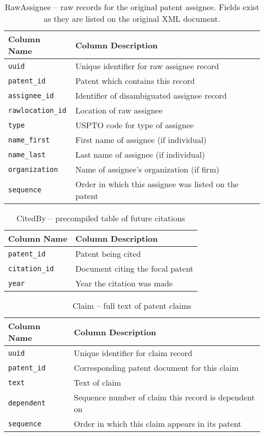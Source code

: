 \begin{table}[ht]
\center
\begin{tabular}{| l | l |}
\hline
Column Name & Column Description \\
\hline
\verb`uuid` & Unique identifier for raw assignee record \\
\verb`patent_id` & Patent which contains this record \\
\verb`assignee_id` & Identifier of disambiguated assignee record \\
\verb`rawlocation_id` & Location of raw assignee \\
\verb`type` & USPTO code for type of assignee \\
\verb`name_first` & First name of assignee (if individual) \\
\verb`name_last` & Last name of assignee (if individual) \\
\verb`organization` & Name of assignee's organization (if firm) \\
\verb`sequence` & Order in which this assignee was listed on the patent \\
\hline
\end{tabular}
\caption{RawAssignee -- raw records for the original patent assignee. Fields exist as they are listed on the original XML document.}
\end{table}


\begin{table}[ht]
\center
\begin{tabular}{| l | l |}
\hline
Column Name & Column Description \\ \hline
\verb`patent_id` & Patent being cited \\
\verb`citation_id` & Document citing the focal patent \\
\verb`year` & Year the citation was made \\
\hline
\end{tabular}
\caption{CitedBy -- precompiled table of future citations}
\end{table}

\begin{table}[ht]
\center
\begin{tabular}{| l | l |}
\hline
Column Name & Column Description \\
\hline
\verb`uuid` & Unique identifier for claim record \\
\verb`patent_id` & Corresponding patent document for this claim \\
\verb`text` & Text of claim \\
\verb`dependent` & Sequence number of claim this record is dependent on \\
\verb`sequence` & Order in which this claim appears in its patent \\
\hline
\end{tabular}
\caption{Claim -- full text of patent claims}
\end{table}

